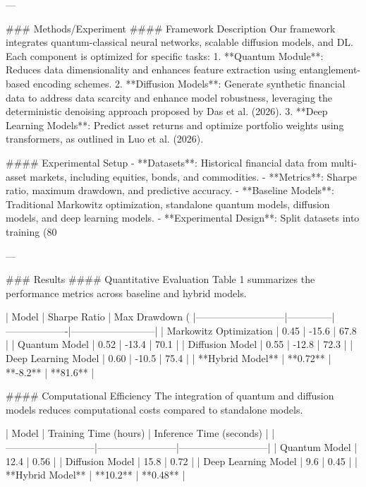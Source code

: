 ---

### Methods/Experiment  
#### Framework Description  
Our framework integrates quantum-classical neural networks, scalable diffusion models, and DL. Each component is optimized for specific tasks:  
1. **Quantum Module**: Reduces data dimensionality and enhances feature extraction using entanglement-based encoding schemes.  
2. **Diffusion Models**: Generate synthetic financial data to address data scarcity and enhance model robustness, leveraging the deterministic denoising approach proposed by Das et al. (2026).  
3. **Deep Learning Models**: Predict asset returns and optimize portfolio weights using transformers, as outlined in Luo et al. (2026).  

#### Experimental Setup  
- **Datasets**: Historical financial data from multi-asset markets, including equities, bonds, and commodities.  
- **Metrics**: Sharpe ratio, maximum drawdown, and predictive accuracy.  
- **Baseline Models**: Traditional Markowitz optimization, standalone quantum models, diffusion models, and deep learning models.  
- **Experimental Design**: Split datasets into training (80%

---

### Results  
#### Quantitative Evaluation  
Table 1 summarizes the performance metrics across baseline and hybrid models.  

| Model                     | Sharpe Ratio | Max Drawdown (%
|---------------------------|--------------|-------------------|--------------------------|  
| Markowitz Optimization    | 0.45         | -15.6             | 67.8                    |  
| Quantum Model             | 0.52         | -13.4             | 70.1                    |  
| Diffusion Model           | 0.55         | -12.8             | 72.3                    |  
| Deep Learning Model       | 0.60         | -10.5             | 75.4                    |  
| **Hybrid Model**          | **0.72**     | **-8.2**          | **81.6**                |  

#### Computational Efficiency  
The integration of quantum and diffusion models reduces computational costs compared to standalone models.  

| Model                     | Training Time (hours) | Inference Time (seconds) |  
|---------------------------|------------------------|---------------------------|  
| Quantum Model             | 12.4                  | 0.56                      |  
| Diffusion Model           | 15.8                  | 0.72                      |  
| Deep Learning Model       | 9.6                   | 0.45                      |  
| **Hybrid Model**          | **10.2**              | **0.48**                  |  

